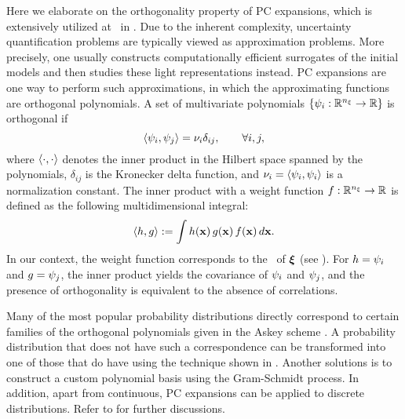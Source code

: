 Here we elaborate on the orthogonality property \cite{xiu2010} of PC expansions, which is extensively utilized at \ in .
Due to the inherent complexity, uncertainty quantification problems are typically viewed as approximation problems.
More precisely, one usually constructs computationally efficient surrogates of the initial models and then studies these light representations instead.
PC expansions \cite{xiu2010} are one way to perform such approximations, in which the approximating functions are orthogonal polynomials.
A set of multivariate polynomials $\{ \psi_i: \mathbb{R}^{n_\xi} \to \mathbb{R} \}$ is orthogonal if
\begin{equation} \elabel{orthogonality}
  \oInner{\pcb_i}{\pcb_j} = \pcn_i \delta_{ij}, \qquad \forall i, j,
\end{equation}
where $\oInner{\cdot}{\cdot}$ denotes the inner product in the Hilbert space spanned by the polynomials, $\delta_{ij}$ is the Kronecker delta function, and $\pcn_i = \oInner{\pcb_i}{\pcb_i}$ is a normalization constant.
The inner product with a weight function $f: \mathbb{R}^{n_\xi} \to \mathbb{R}$ is defined as the following multidimensional integral:
\begin{equation} \elabel{inner-product}
  \oInner{h}{g} := \int h(\vX) \, g(\vX) \, \fPDF(\vX) \, d\vX.
\end{equation}
In our context, the weight function corresponds to the \pdf\ of $\boldsymbol{\xi}$ (see ).
For $h = \psi_i$ and $g = \psi_j$, the inner product yields the covariance of $\psi_i$ and $\psi_j$, and the presence of orthogonality is equivalent to the absence of correlations.

Many of the most popular probability distributions directly correspond to certain families of the orthogonal polynomials given in the Askey scheme \cite{xiu2010}.
A probability distribution that does not have such a correspondence can be transformed into one of those that do have using the technique shown in .
Another solutions is to construct a custom polynomial basis using the Gram-Schmidt process.
In addition, apart from continuous, PC expansions can be applied to discrete distributions.
Refer to \cite{xiu2010} for further discussions.
